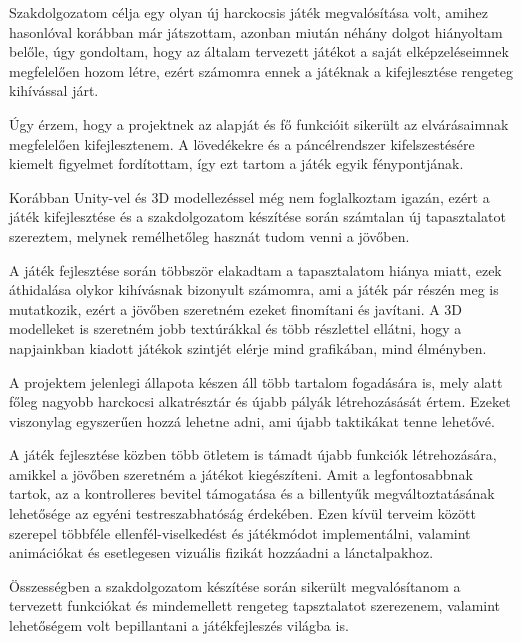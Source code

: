 \documentclass[
]{thesis-ekf}
\theoremstyle{definition}
\theoremstyle{remark}
\begin{document}
Szakdolgozatom célja egy olyan új harckocsis játék megvalósítása volt, amihez hasonlóval korábban már játszottam, azonban miután néhány dolgot hiányoltam belőle, úgy gondoltam, hogy az általam tervezett játékot a saját elképzeléseimnek megfelelően hozom létre, ezért számomra ennek a játéknak a kifejlesztése rengeteg kihívással járt.

Úgy érzem, hogy a projektnek az alapját és fő funkcióit sikerült az elvárásaimnak megfelelően kifejlesztenem. A lövedékekre és a páncélrendszer kifelszestésére kiemelt figyelmet fordítottam, így ezt tartom a játék egyik fénypontjának.

Korábban Unity-vel és 3D modellezéssel még nem foglalkoztam igazán, ezért a játék kifejlesztése és a szakdolgozatom készítése során számtalan új tapasztalatot szereztem, melynek remélhetőleg hasznát tudom venni a jövőben.

A játék fejlesztése során többször elakadtam a tapasztalatom hiánya miatt, ezek áthidalása olykor kihívásnak bizonyult számomra, ami a játék pár részén meg is mutatkozik, ezért a jövőben szeretném ezeket finomítani és javítani. A 3D modelleket is szeretném jobb textúrákkal és több részlettel ellátni, hogy a napjainkban kiadott játékok szintjét elérje mind grafikában, mind élményben.

A projektem jelenlegi állapota készen áll több tartalom fogadására is, mely alatt főleg nagyobb harckocsi alkatrésztár és újabb pályák létrehozásását értem. Ezeket viszonylag egyszerűen hozzá lehetne adni, ami újabb taktikákat tenne lehetővé.

A játék fejlesztése közben több ötletem is támadt újabb funkciók létrehozására, amikkel a jövőben szeretném a játékot kiegészíteni. Amit a legfontosabbnak tartok, az a kontrolleres bevitel támogatása és a billentyűk megváltoztatásának lehetősége az egyéni testreszabhatóság érdekében. Ezen kívül terveim között szerepel többféle ellenfél-viselkedést és játékmódot implementálni, valamint animációkat és esetlegesen vizuális fizikát hozzáadni a lánctalpakhoz.

Összességben a szakdolgozatom készítése során sikerült megvalósítanom a tervezett funkciókat és mindemellett rengeteg tapsztalatot szerezenem, valamint lehetőségem volt bepillantani a játékfejleszés világba is.
\end{document}
